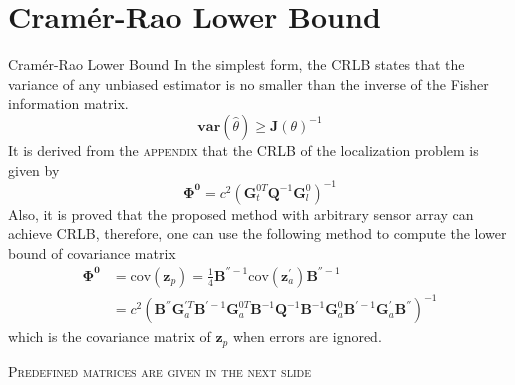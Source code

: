 \documentclass[10pt]{beamer}
\begin{document}
\section{Cram\'{e}r-Rao Lower Bound}

\begin{frame}{Cram\'{e}r-Rao Lower Bound}
  In the simplest form, the CRLB states that the variance of any unbiased estimator
  is no smaller than the inverse of the Fisher information matrix.
   $$\textbf{var}(\hat{\theta}) \geqslant \textbf{J}(\theta)^{-1} $$
  It is derived from the \textsc{appendix} that the CRLB of the localization problem
  is given by
   $$ \bm{\Phi^0} = c^2 (\textbf{G}_t^{0T} \textbf{Q}^{-1} \textbf{G}_l^0)^{-1} $$
  Also, it is proved that the proposed method with arbitrary sensor array can achieve CRLB,
  therefore, one can use the following method to compute the lower bound of covariance matrix
  \begin{align*}
    \boldsymbol{\Phi^0} &= \text{cov}(\textbf{z}_p) = \frac{1}{4} \textbf{B}^{''-1} \text{cov} (\textbf{z}_a^{'}) \textbf{B}^{''-1} \\
           &= c^2 ( \textbf{B}^{''} \textbf{G}_a^{'T} \textbf{B}^{'-1} \textbf{G}_a^{0T} \textbf{B}^{-1} \textbf{Q}^{-1} \textbf{B}^{-1} \textbf{G}_a^{0}  \textbf{B}^{'-1} \textbf{G}_a^{'} \textbf{B}^{''} )^{-1}
  \end{align*}
  which is the covariance matrix of $\textbf{z}_p$ when errors are ignored.
  \begin{center}
    \textsc{Predefined matrices are given in the next slide}
  \end{center}
\end{frame}
\end{document}
